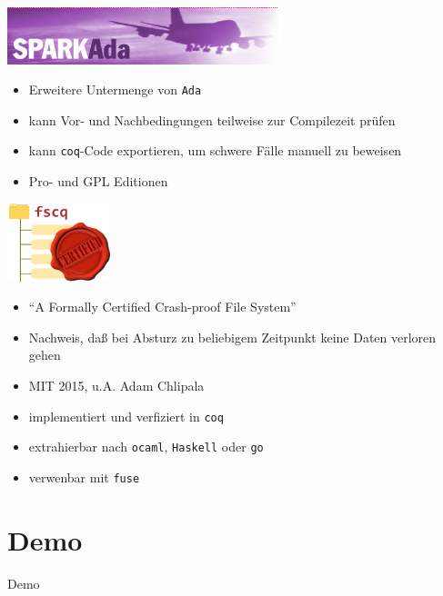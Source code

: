 \documentclass[aspectratio=169]{beamer}
\begin{document}
\begin{frame}
  \begin{center}
    \includegraphics[width=8.0cm]{spark_logo.jpg}    
  \end{center}
  \begin{itemize}
  \item Erweitere Untermenge von \texttt{Ada}
  \item kann Vor- und Nachbedingungen teilweise zur Compilezeit prüfen
  \item kann \texttt{coq}-Code exportieren, um schwere Fälle manuell zu beweisen
  \item Pro- und GPL Editionen
  \end{itemize}
\end{frame}
\begin{frame}
  \begin{center}
    \includegraphics[width=3.0cm]{fscq_logo.png}
  \end{center}
  \begin{itemize}
  \item ``A Formally Certified Crash-proof File System''
  \item Nachweis, daß bei Absturz zu beliebigem Zeitpunkt keine Daten verloren gehen
  \item MIT 2015, u.A. Adam Chlipala
  \item implementiert und verfiziert in \texttt{coq}
  \item extrahierbar nach \texttt{ocaml}, \texttt{Haskell} oder \texttt{go}
  \item verwenbar mit \texttt{fuse} 
  \end{itemize}
\end{frame}
\section{Demo}
\begin{frame}
  \begin{center}
    \huge{Demo}
  \end{center}
\end{frame}
\end{document}
